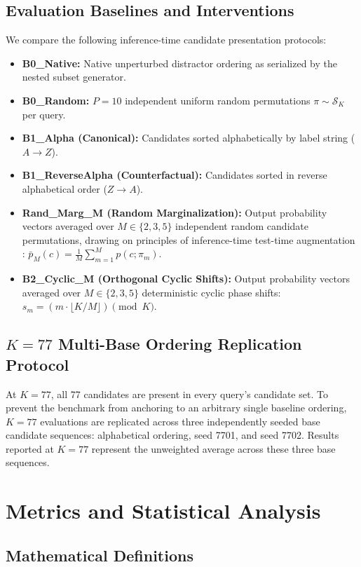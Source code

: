 \documentclass[11pt,a4paper]{article}
\begin{document}
\subsection{Evaluation Baselines and Interventions}
We compare the following inference-time candidate presentation protocols:
\begin{itemize}
    \item \textbf{B0\_Native:} Native unperturbed distractor ordering as serialized by the nested subset generator.
    \item \textbf{B0\_Random:} $P=10$ independent uniform random permutations $\pi \sim \mathcal{S}_K$ per query.
    \item \textbf{B1\_Alpha (Canonical):} Candidates sorted alphabetically by label string ($A \to Z$).
    \item \textbf{B1\_ReverseAlpha (Counterfactual):} Candidates sorted in reverse alphabetical order ($Z \to A$).
    \item \textbf{Rand\_Marg\_M (Random Marginalization):} Output probability vectors averaged over $M \in \{2, 3, 5\}$ independent random candidate permutations, drawing on principles of inference-time test-time augmentation \citep{ayhan2018test, shanmugam2020when}: $\bar{p}_M(c) = \frac{1}{M}\sum_{m=1}^M p(c; \pi_m)$.
    \item \textbf{B2\_Cyclic\_M (Orthogonal Cyclic Shifts):} Output probability vectors averaged over $M \in \{2, 3, 5\}$ deterministic cyclic phase shifts: $s_m = (m \cdot \lfloor K / M \rfloor) \pmod K$.
\end{itemize}

\subsection{\texorpdfstring{$K=77$}{K=77} Multi-Base Ordering Replication Protocol}
At $K=77$, all 77 candidates are present in every query's candidate set. To prevent the benchmark from anchoring to an arbitrary single baseline ordering, $K=77$ evaluations are replicated across three independently seeded base candidate sequences: alphabetical ordering, seed 7701, and seed 7702. Results reported at $K=77$ represent the unweighted average across these three base sequences.

\section{Metrics and Statistical Analysis}

\subsection{Mathematical Definitions}
\end{document}
